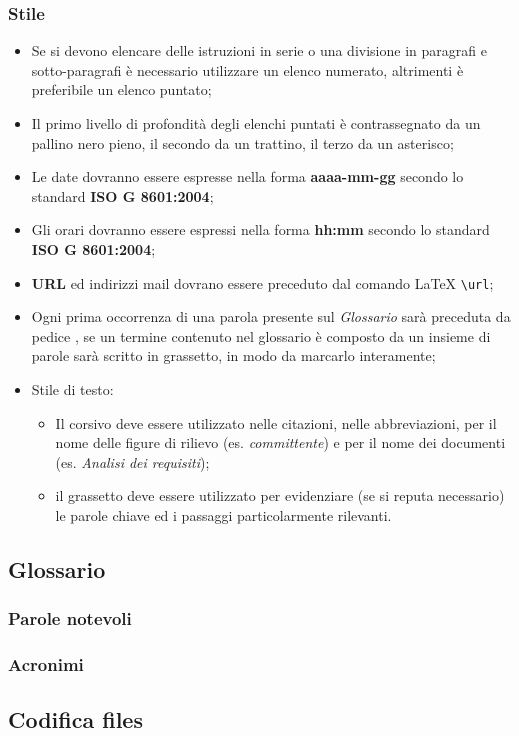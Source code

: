 \subsubsection{Stile}
\begin{itemize}
\item Se si devono elencare delle istruzioni in serie o una divisione in paragrafi e sotto-paragrafi è necessario utilizzare un elenco numerato, altrimenti è preferibile un elenco puntato;

\item Il primo livello di profondità degli elenchi puntati è contrassegnato da un pallino nero pieno, il secondo da un trattino, il terzo da un asterisco;

\item Le date dovranno essere espresse nella forma \textbf{aaaa-mm-gg} secondo lo standard  \textbf{ISO G 8601:2004};

\item Gli orari dovranno essere espressi nella forma \textbf{hh:mm} secondo lo standard \textbf{ISO G 8601:2004};

\item \textbf{URL} ed indirizzi mail dovrano essere preceduto dal comando \LaTeX{} \verb!\url!;

\item Ogni prima occorrenza di una parola presente sul \textit{Glossario} sarà preceduta da pedice , se un termine contenuto nel glossario è composto da un insieme di parole sarà scritto in grassetto, in modo da marcarlo interamente;

\item Stile di testo:

\begin{itemize}

\item Il corsivo deve essere utilizzato nelle citazioni, nelle abbreviazioni, per il nome delle figure di rilievo (es. \textit{committente}) e per il nome dei documenti (es. \textit{Analisi dei requisiti});

\item il grassetto deve essere utilizzato per evidenziare (se si reputa necessario) le parole chiave ed i passaggi particolarmente rilevanti.

\end{itemize}

\end{itemize}

\subsection{Glossario}
\subsubsection{Parole notevoli}
\subsubsection{Acronimi}
\subsection{Codifica files}